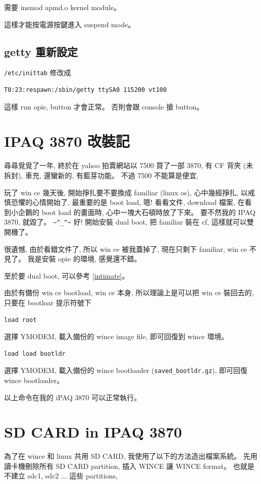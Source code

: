 \documentclass[12pt,a4paper]{article}
\begin{document}
\begin{CJK}{UTF8}{bsmi}
需要 insmod apmd.o kernel module。

這樣才能按電源按鍵進入 suspend mode。

\subsection{getty 重新設定}
\verb+/etc/inittab+
修改成
\begin{verbatim}
T0:23:respawn:/sbin/getty ttySA0 115200 vt100
\end{verbatim}
這樣 run opie, button 才會正常。
否則會跟 console 搶 button。


\section{IPAQ 3870 改裝記}

尋尋覓覓了一年, 終於在 yahoo 拍賣網站以 7500 買了一部 3870,
有 CF 背夾 (未拆封), 車充, 還蠻新的, 
有藍芽功能。
不過 7500 不能算是便宜,

玩了 win ce 幾天後, 開始掙扎要不要換成 familiar (linux os),
心中幾經掙扎, 以戒慎恐懼的心情開始了,
最重要的是 boot load, 嗯! 看看文件, download 檔案,
在看到小企鵝的 boot load 的畫面時, 心中一塊大石頓時放了下來。
要不然我的 IPAQ 3870, 就毀了。 \verb+~^_^~+
好! 開始安裝 dual boot, 把 familiar 裝在 cf,
這樣就可以雙開機了。

很遺憾, 由於看錯文件了, 所以 win ce 被我蓋掉了,
現在只剩下 familiar, win ce 不見了。 我是安裝 opie 的環境,
感覺還不錯。

至於要 dual boot,
可以參考 \ref{intimate}。

由於有備份 win ce bootload, win ce 本身, 所以理論上是可以把
win ce 裝回去的, 只要在 bootloar 提示符號下
\begin{verbatim}
load root
\end{verbatim}
選擇 YMODEM, 載入備份的 wince image file, 即可回復到 
wince 環境。

\begin{verbatim}
load load bootldr
\end{verbatim}
選擇 YMODEM, 載入備份的 wince bootloader (\verb+saved_bootldr.gz+),
即可回復 wince bootloader。

以上命令在我的 iPAQ 3870 可以正常執行。

\section{SD CARD in IPAQ 3870}
為了在 wince 和 linux 共用 SD CARD,
我使用了以下的方法造出檔案系統。
先用讀卡機刪除所有 SD CARD partition,
插入 WINCE 讓 WINCE format。
也就是不建立 sdc1, sdc2 ... 這些 partitions,



\end{CJK}
\end{document}
